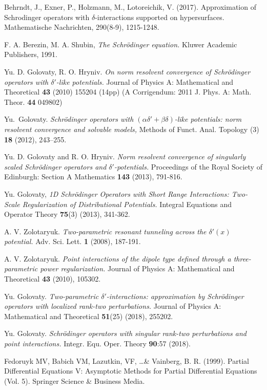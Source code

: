 \documentclass[reqno]{amsart}
\theoremstyle{plain}
\numberwithin{equation}{section}
\newcommand{\rd}[1]{{\color{red}{#1}}}
\begin{document}
\begin{thebibliography}{10}
Behrndt, J., Exner, P., Holzmann, M.,  Lotoreichik, V. (2017). Approximation of Schrodinger operators with $\delta$-interactions supported on hypersurfaces. Mathematische Nachrichten, 290(8-9), 1215-1248.


 F. A. Berezin, M. A. Shubin,
\textit{The Schr\"{o}dinger equation.} Kluwer Academic
Publishers, 1991.

    Yu. D. Golovaty,  R. O. Hryniv.
    \textit{On norm resolvent convergence of Schr\"{o}dinger
    operators with $\delta'$-like potentials.}
   Journal of Physics A: Mathematical and Theoretical \textbf{43} (2010) 155204 (14pp) (A Corrigendum: 2011 J. Phys. A: Math. Theor. \textbf{44} 049802)

    Yu.~Golovaty.
    \textit{Schr\"{o}dinger operators with  $(\alpha\delta'+\beta \delta)$-like potentials: norm resolvent convergence and solvable models,} Methods of Funct. Anal. Topology (3) \textbf{18} (2012), 243--255.

 Yu. D. Golovaty and R. O. Hryniv. \textit{Norm resolvent convergence of singularly scaled Schr\"{o}dinger operators and $\delta'$-potentials.} Proceedings of the Royal Society of Edinburgh: Section A Mathematics \textbf{143} (2013),  791-816.

    Yu. Golovaty, \textit{1D Schr\"{o}dinger Operators with Short Range Interactions: Two-Scale Regularization of Distributional Potentials.} Integral Equations and Operator Theory \textbf{75}(3) (2013),   341-362.


    A. V. Zolotaryuk.
    \textit{Two-parametric resonant tunneling across the $\delta'(x)$ potential.}
    Adv. Sci. Lett. {\bf 1} (2008), 187-191.

    A. V. Zolotaryuk.
    \textit{Point interactions of the dipole type defined through a three-parametric power regularization.}
    Journal of Physics A: Mathematical and Theoretical {\bf 43} (2010), 105302.

	Yu. Golovaty.
	\textit{Two-parametric  $\delta'$-interactions: approximation by
 	Schr\"{o}dinger operators with localized rank-two perturbations.}
 	Journal of Physics A: Mathematical and Theoretical \textbf{51}(25) (2018), 255202.

	Yu. Golovaty.
	\textit{Schr\"{o}dinger operators with singular rank-two perturbations and point interactions.}
	Integr. Equ. Oper. Theory \textbf{90}:57 (2018).



Fedoruyk MV, Babich VM, Lazutkin, VF, \dots \& Vainberg, B. R.
(1999). Partial Differential Equations V: Asymptotic Methods for
Partial Differential Equations (Vol. 5). Springer Science \&
Business Media.

\bibitem{Nazarov}\rd{Nazarov}

\bibitem{Perez}\rd{Perez}

\end{thebibliography}
\end{document}
